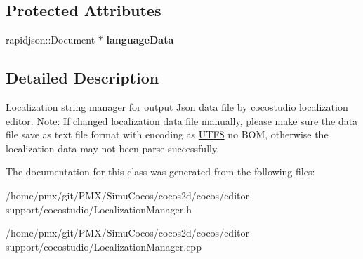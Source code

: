 \subsection*{Protected Attributes}
\begin{DoxyCompactItemize}
\item 
\mbox{\label{classcocostudio_1_1JsonLocalizationManager_a1a2629ea1327b323af06a3a32f5eac3e}} 
rapidjson\+::\+Document $\ast$ {\bfseries language\+Data}
\end{DoxyCompactItemize}


\subsection{Detailed Description}
Localization string manager for output \hyperlink{structJson}{Json} data file by cocostudio localization editor. Note\+: If changed localization data file manually, please make sure the data file save as text file format with encoding as \textquotesingle{}\hyperlink{structUTF8}{U\+T\+F8} no B\+OM\textquotesingle{}, otherwise the localization data may not been parse successfully. 

The documentation for this class was generated from the following files\+:\begin{DoxyCompactItemize}
\item 
/home/pmx/git/\+P\+M\+X/\+Simu\+Cocos/cocos2d/cocos/editor-\/support/cocostudio/Localization\+Manager.\+h\item 
/home/pmx/git/\+P\+M\+X/\+Simu\+Cocos/cocos2d/cocos/editor-\/support/cocostudio/Localization\+Manager.\+cpp\end{DoxyCompactItemize}
